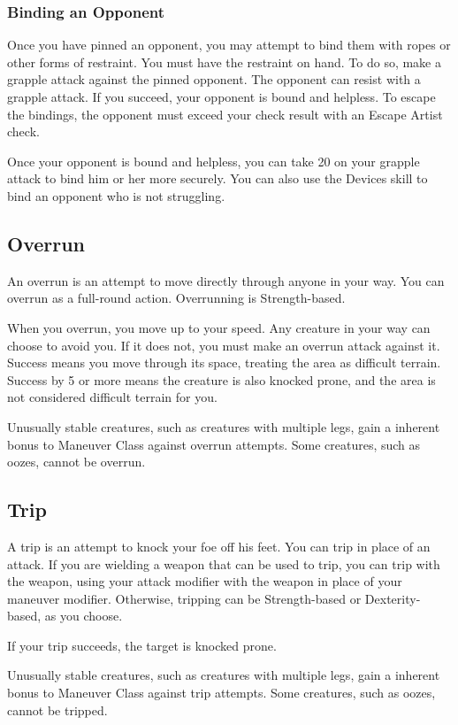 \subsubsection{Binding an Opponent}
Once you have pinned an opponent, you may attempt to bind them with ropes or other forms of restraint. You must have the restraint on hand. To do so, make a grapple attack against the pinned opponent. The opponent can resist with a grapple attack. If you succeed, your opponent is bound and helpless. To escape the bindings, the opponent must exceed your check result with an Escape Artist check.

Once your opponent is bound and helpless, you can take 20 on your grapple attack to bind him or her more securely. You can also use the Devices skill to bind an opponent who is not struggling.

\subsection{Overrun}
An overrun is an attempt to move directly through anyone in your way. You can overrun as a full-round action. Overrunning is Strength-based.

When you overrun, you move up to your speed. Any creature in your way can choose to avoid you. If it does not, you must make an overrun attack against it. Success means you move through its space, treating the area as difficult terrain. Success by 5 or more means the creature is also knocked prone, and the area is not considered difficult terrain for you.

Unusually stable creatures, such as creatures with multiple legs, gain a  inherent bonus to Maneuver Class against overrun attempts. Some creatures, such as oozes, cannot be overrun.

\subsection{Trip}
A trip is an attempt to knock your foe off his feet. You can trip in place of an attack. If you are wielding a weapon that can be used to trip, you can trip with the weapon, using your attack modifier with the weapon in place of your maneuver modifier. Otherwise, tripping can be Strength-based or Dexterity-based, as you choose.

If your trip succeeds, the target is knocked prone.

Unusually stable creatures, such as creatures with multiple legs, gain a  inherent bonus to Maneuver Class against trip attempts. Some creatures, such as oozes, cannot be tripped.

